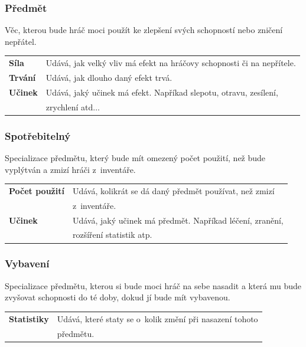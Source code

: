 \documentclass[12pt,a4paper]{article}
\begin{document}
\subsubsection{Předmět}
Věc, kterou bude hráč moci použít ke zlepšení svých schopností nebo zničení
nepřátel.\\[5pt]

\begin{tabular*}{0.87\textwidth}{ll}
  \bf Síla & Udává, jak velký vliv má efekt na hráčovy schopnosti či na
  nepřítele. \\[7pt]
  \bf Trvání & Udává, jak dlouho daný efekt trvá. \\[7pt]
  \bf Učinek & Udává, jaký učinek má efekt. Napříkad slepotu, otravu, zesílení,\\
             & zrychlení atd$\ldots$ \\[7pt]
\end{tabular*}

\subsubsection{Spotřebitelný}
Specializace předmětu, který bude mít omezený počet použití, než bude vyplýtván
a zmizí hráči z~inventáře. \\[5pt]

\begin{tabular*}{0.87\textwidth}{ll}
  \bf Počet použití & Udává, kolikrát se dá daný předmět používat, než zmizí\\
                    & z~inventáře.\\[7pt]
  \bf Učinek & Udává, jaký učinek má předmět. Napříkad léčení, zranění,\\
             & rozšíření statistik atp. \\[7pt]
\end{tabular*}

\subsubsection{Vybavení}
Specializace předmětu, kterou si bude moci hráč na sebe nasadit a která mu bude
zvyšovat schopnosti do té doby, dokud jí bude mít vybavenou.\\[5pt]

\begin{tabular*}{0.78\textwidth}{ll}
  \bf Statistiky & Udává, které staty se o~kolik změní při nasazení tohoto\\
  & předmětu.\\[7pt]
\end{tabular*}
\end{document}
